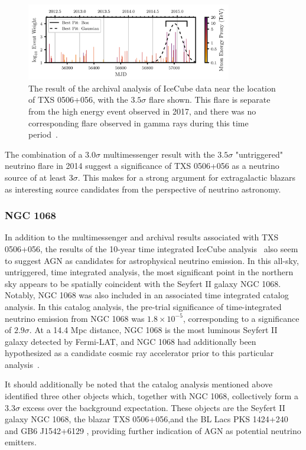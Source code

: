 \begin{figure}[h]
\centering
\includegraphics[width=0.8\textwidth]{figs/TXS_flarecurve.png}
\caption{The result of the archival analysis of IceCube data near the location of TXS 0506+056, with the $3.5\sigma$ flare shown. This flare is separate from the high energy event observed in 2017, and there was no corresponding flare observed in gamma rays during this time period~\cite{TXS_Archival}. }
\label{fig:TXS_flarecurve}
\end{figure}

The combination of a $3.0 \sigma$ multimessenger result with the $3.5 \sigma$ "untriggered" neutrino flare in 2014 suggest a significance of TXS 0506+056 as a neutrino source of at least $3 \sigma$. This makes for a strong argument for extragalactic blazars as interesting source candidates from the perspective of neutrino astronomy. 

\subsubsection{NGC 1068}
In addition to the multimessenger and archival results associated with TXS 0506+056, the results of the 10-year time integrated IceCube analysis~\cite{10yr_tint} also seem to suggest AGN as candidates for astrophysical neutrino emission. In this all-sky, untriggered, time integrated analysis, the most significant point in the northern sky appears to be spatially coincident with the Seyfert II galaxy NGC 1068. Notably, NGC 1068 was also included in an associated time integrated catalog analysis. In this catalog analysis, the pre-trial significance of time-integrated neutrino emission from NGC 1068 was $1.8 \times 10^{-5}$, corresponding to a significance of $2.9\sigma$. At a 14.4 Mpc distance, NGC 1068 is the most luminous Seyfert II galaxy detected by Fermi-LAT, and NGC 1068 had additionally been hypothesized as a candidate cosmic ray accelerator prior to this particular analysis\ \cite{NCG_1}\cite{NGC_2}\cite{NGC_3}.

It should additionally be noted that the catalog analysis mentioned above identified three other objects which, together with NGC 1068, collectively form a $3.3\sigma$ excess over the background expectation. These objects are the Seyfert II galaxy NGC 1068, the blazar TXS 0506+056,and the BL Lacs PKS 1424+240 and GB6 J1542+6129 \cite{10yr_tint}, providing further indication of AGN as potential neutrino emitters. 

